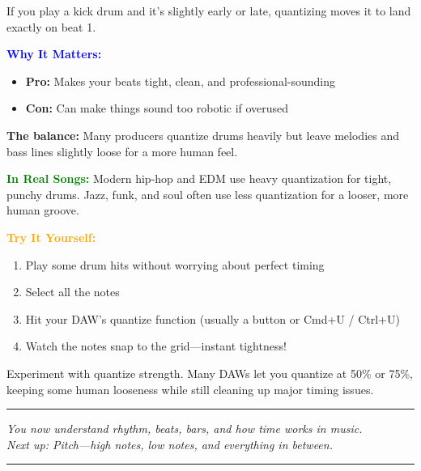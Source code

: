 \documentclass[11pt,letterpaper]{article}
\newcommand{\bluepurple}[1]{\textcolor{blue}{\textbf{#1}}}
\newcommand{\greentext}[1]{\textcolor{green}{\textbf{#1}}}
\newcommand{\orangetext}[1]{\textcolor{orange}{\textbf{#1}}}
\begin{document}
If you play a kick drum and it's slightly early or late, quantizing moves it to land exactly on beat 1.

\textbf{\bluepurple{Why It Matters:}} 
\begin{itemize}[leftmargin=*]
\item \textbf{Pro:} Makes your beats tight, clean, and professional-sounding
\item \textbf{Con:} Can make things sound too robotic if overused
\end{itemize}

\textbf{The balance:} Many producers quantize drums heavily but leave melodies and bass lines slightly loose for a more human feel.

\textbf{\greentext{In Real Songs:}} Modern hip-hop and EDM use heavy quantization for tight, punchy drums. Jazz, funk, and soul often use less quantization for a looser, more human groove.

\begin{tcolorbox}[colback=orange!10,colframe=orange,width=\textwidth,arc=3mm,boxrule=1pt]
\textbf{\orangetext{Try It Yourself:}}

\begin{enumerate}[leftmargin=*]
\item Play some drum hits without worrying about perfect timing
\item Select all the notes
\item Hit your DAW's quantize function (usually a button or Cmd+U / Ctrl+U)
\item Watch the notes snap to the grid—instant tightness!
\end{enumerate}

Experiment with quantize strength. Many DAWs let you quantize at 50\% or 75\%, keeping some human looseness while still cleaning up major timing issues.
\end{tcolorbox}

\vspace{1cm}

\begin{center}
\rule{0.8\textwidth}{0.5pt}

\vspace{0.3cm}

\textit{You now understand rhythm, beats, bars, and how time works in music. \\
Next up: Pitch—high notes, low notes, and everything in between.}

\vspace{0.3cm}

\rule{0.8\textwidth}{0.5pt}
\end{center}
\end{document}
